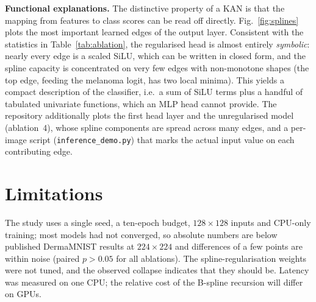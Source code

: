 \documentclass[conference]{IEEEtran}
\begin{document}
\textbf{Functional explanations.} The distinctive property of a KAN is that the mapping from features to class scores can be read off directly. Fig.~\ref{fig:splines} plots the most important learned edges of the output layer. Consistent with the statistics in Table~\ref{tab:ablation}, the regularised head is almost entirely \emph{symbolic}: nearly every edge is a scaled SiLU, which can be written in closed form, and the spline capacity is concentrated on very few edges with non-monotone shapes (the top edge, feeding the melanoma logit, has two local minima). This yields a compact description of the classifier, i.e.\ a sum of SiLU terms plus a handful of tabulated univariate functions, which an MLP head cannot provide. The repository additionally plots the first head layer and the unregularised model (ablation~4), whose spline components are spread across many edges, and a per-image script (\texttt{inference\_demo.py}) that marks the actual input value on each contributing edge.

\section{Limitations}
The study uses a single seed, a ten-epoch budget, $128\times128$ inputs and CPU-only training; most models had not converged, so absolute numbers are below published DermaMNIST results at $224\times224$ and differences of a few points are within noise (paired $p>0.05$ for all ablations). The spline-regularisation weights were not tuned, and the observed collapse indicates that they should be. Latency was measured on one CPU; the relative cost of the B-spline recursion will differ on GPUs.
\end{document}
